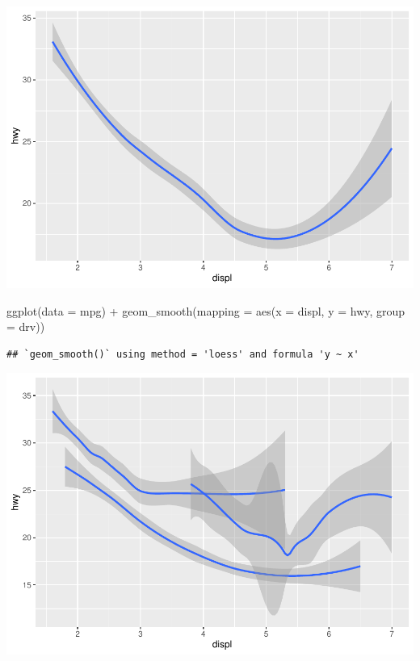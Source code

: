\documentclass[
]{article}
\newenvironment{Shaded}{\begin{snugshade}}{\end{snugshade}}
\newcommand{\AttributeTok}[1]{\textcolor[rgb]{0.77,0.63,0.00}{#1}}
\newcommand{\FunctionTok}[1]{\textcolor[rgb]{0.00,0.00,0.00}{#1}}
\newcommand{\NormalTok}[1]{#1}
\newcommand{\SpecialCharTok}[1]{\textcolor[rgb]{0.00,0.00,0.00}{#1}}
\begin{document}
\includegraphics{Assignments_files/figure-latex/unnamed-chunk-43-1.pdf}

\begin{Shaded}
\begin{Highlighting}[]
\FunctionTok{ggplot}\NormalTok{(}\AttributeTok{data =}\NormalTok{ mpg) }\SpecialCharTok{+}
  \FunctionTok{geom\_smooth}\NormalTok{(}\AttributeTok{mapping =} \FunctionTok{aes}\NormalTok{(}\AttributeTok{x =}\NormalTok{ displ, }\AttributeTok{y =}\NormalTok{ hwy, }\AttributeTok{group =}\NormalTok{ drv))}
\end{Highlighting}
\end{Shaded}

\begin{verbatim}
## `geom_smooth()` using method = 'loess' and formula 'y ~ x'
\end{verbatim}

\includegraphics{Assignments_files/figure-latex/unnamed-chunk-43-2.pdf}
\end{document}
